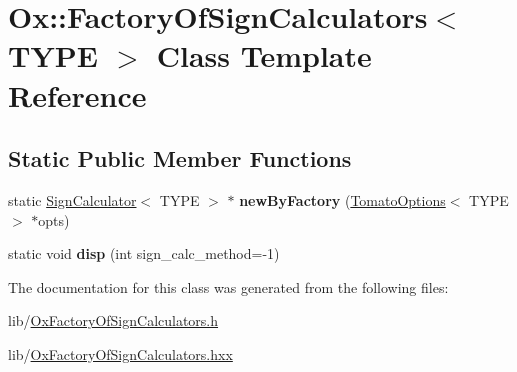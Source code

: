 \hypertarget{class_ox_1_1_factory_of_sign_calculators}{\section{Ox\-:\-:Factory\-Of\-Sign\-Calculators$<$ T\-Y\-P\-E $>$ Class Template Reference}
\label{class_ox_1_1_factory_of_sign_calculators}
}
\subsection*{Static Public Member Functions}
\begin{DoxyCompactItemize}
\item 
\hypertarget{class_ox_1_1_factory_of_sign_calculators_a1241354771109d5dbd3ffb3d6ec817a3}{static \hyperlink{class_ox_1_1_sign_calculator}{Sign\-Calculator}$<$ T\-Y\-P\-E $>$ $\ast$ {\bfseries new\-By\-Factory} (\hyperlink{struct_ox_1_1_tomato_options}{Tomato\-Options}$<$ T\-Y\-P\-E $>$ $\ast$opts)}\label{class_ox_1_1_factory_of_sign_calculators_a1241354771109d5dbd3ffb3d6ec817a3}

\item 
\hypertarget{class_ox_1_1_factory_of_sign_calculators_a1230de323f020ee2f5bef7d93636c6f2}{static void {\bfseries disp} (int sign\-\_\-calc\-\_\-method=-\/1)}\label{class_ox_1_1_factory_of_sign_calculators_a1230de323f020ee2f5bef7d93636c6f2}

\end{DoxyCompactItemize}


The documentation for this class was generated from the following files\-:\begin{DoxyCompactItemize}
\item 
lib/\hyperlink{_ox_factory_of_sign_calculators_8h}{Ox\-Factory\-Of\-Sign\-Calculators.\-h}\item 
lib/\hyperlink{_ox_factory_of_sign_calculators_8hxx}{Ox\-Factory\-Of\-Sign\-Calculators.\-hxx}\end{DoxyCompactItemize}
